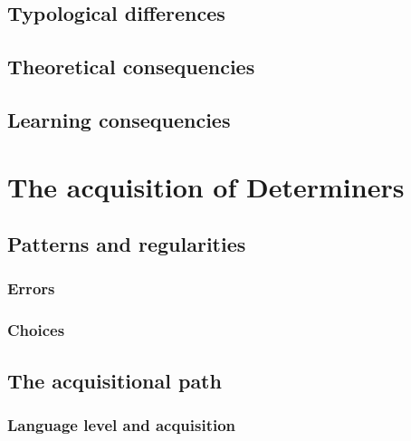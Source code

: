 \documentclass[
  a4paper,
  twoside,
  12pt,
  chapterprefix=false,
  bibliography=totocnumbered,
  listof=flat]{scrbook}
\begin{document}
\hypertarget{typological-differences}{%
\subsection{Typological differences}\label{typological-differences}}

\hypertarget{theoretical-consequencies}{%
\subsection{Theoretical consequencies}\label{theoretical-consequencies}}

\hypertarget{learning-consequencies}{%
\subsection{Learning consequencies}\label{learning-consequencies}}

\hypertarget{the-acquisition-of-determiners}{%
\section{The acquisition of Determiners}\label{the-acquisition-of-determiners}}

\hypertarget{patterns-and-regularities}{%
\subsection{Patterns and regularities}\label{patterns-and-regularities}}

\hypertarget{errors}{%
\subsubsection{Errors}\label{errors}}

\hypertarget{choices}{%
\subsubsection{Choices}\label{choices}}

\hypertarget{the-acquisitional-path}{%
\subsection{The acquisitional path}\label{the-acquisitional-path}}

\hypertarget{language-level-and-acquisition}{%
\subsubsection{Language level and acquisition}\label{language-level-and-acquisition}}
\end{document}
